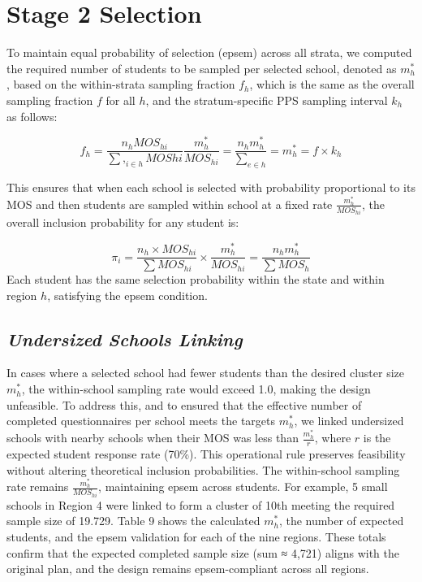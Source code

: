 \documentclass[
  12pt]{article}
\begin{document}
\section{Stage 2 Selection}\label{stage-2-selection}

To maintain equal probability of selection (epsem) across all strata, we
computed the required number of students to be sampled per selected
school, denoted as \(m^*_h\) , based on the within-strata sampling
fraction \(f_h\), which is the same as the overall sampling fraction
\(f\) for all \(h\), and the stratum-specific PPS sampling interval
\(k_h\) as follows:

\[
f_h = \frac{n_h MOS_{hi} }{\sum,_{i \in h} MOS{hi} } \frac{m^*_h}{MOS_{hi}}
 = \frac{n_h m^*_h}{\sum_{e \in h}} = m^*_h = f \times k_h
\]

This ensures that when each school is selected with probability
proportional to its MOS and then students are sampled within school at a
fixed rate \(\frac{m^*_h}{MOS_{hi}}\), the overall inclusion probability
for any student is:

\[
\pi_{i} = \frac{n_h \times MOS_{hi}}{\sum MOS_{hi}} \times \frac{m^*_h}{MOS_{hi}} = \frac{n_h m^*_h}{\sum MOS_h} 
\]Each student has the same selection probability within the state and
within region \(h\), satisfying the epsem condition.

\subsection{\texorpdfstring{\emph{Undersized Schools
Linking}}{Undersized Schools Linking}}\label{undersized-schools-linking}

In cases where a selected school had fewer students than the desired
cluster size \(m^*_h\), the within-school sampling rate would exceed
1.0, making the design unfeasible. To address this, and to ensured that
the effective number of completed questionnaires per school meets the
targets \(m^*_h\), we linked undersized schools with nearby schools when
their MOS was less than \(\frac{m^*_h}{r}\), where \(r\) is the expected
student response rate (70\%). This operational rule preserves
feasibility without altering theoretical inclusion probabilities. The
within-school sampling rate remains \(\frac{m^*_h}{MOS_{hi}}\),
maintaining epsem across students. For example, 5 small schools in
Region 4 were linked to form a cluster of 10th meeting the required
sample size of 19.729. Table 9 shows the calculated \(m^*_h\), the
number of expected students, and the epsem validation for each of the
nine regions. These totals confirm that the expected completed sample
size (sum ≈ 4,721) aligns with the original plan, and the design remains
epsem-compliant across all regions.
\end{document}
